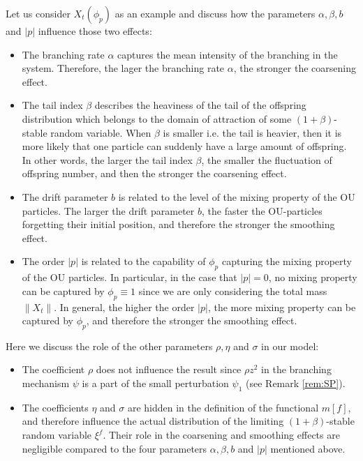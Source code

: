 \documentclass[EJP]{ejpecp} %
\begin{document}
Let us consider $X_t(\phi_p)$ as an example and discuss how the parameters $\alpha, \beta, b$ and $|p|$
influence those two effects:
\begin{itemize}
\item
  The branching rate $\alpha$ captures the mean intensity of the branching in the system.
  Therefore, the lager the branching rate $\alpha$, the stronger the coarsening effect.
\item
  The tail index $\beta$ describes the heaviness of the tail of the offspring distribution which belongs to the domain of attraction of some $(1+\beta)$-stable random variable.
When $\beta$ is smaller i.e. the tail is heavier, then it is more likely that 
one particle can suddenly have a large amount of offspring.
In other words, the larger the tail index $\beta$, the smaller the fluctuation of offspring number, and then the stronger the coarsening effect.
\item
 The drift parameter $b$ is related to the level of the mixing property of the OU particles.
  The larger the drift parameter $b$, the faster the OU-particles forgetting their initial position, and therefore the stronger the smoothing effect.
\item
    The order $|p|$ is related to the capability of $\phi_p$ capturing the mixing property of the OU particles.
  In particular, in the case that $|p| = 0$, no mixing property can be captured by $\phi_p \equiv 1$ since we are only considering the total mass $\|X_t\|$.
  In general, the higher the order $|p|$, the more mixing property can be captured by $\phi_p$, and therefore the stronger the smoothing effect.
\end{itemize}
Here we discuss the role of the other parameters $\rho, \eta$ and $\sigma$ in our model:
\begin{itemize}
\item
  The coefficient $\rho$ does not influence the result since $\rho z^2$ in the branching mechanism $\psi$ is a part of the small perturbation $\psi_1$
  (see Remark \ref{rem:SP}).
\item
  The coefficients $\eta$ and $\sigma$ are hidden in the definition of the functional $m[f]$, and therefore influence the actual distribution of the limiting $(1+\beta)$-stable random variable $\xi^f$.
  Their role in the coarsening and smoothing effects are negligible compared to the four parameters $\alpha, \beta, b$ and $|p|$ mentioned above.
\end{itemize}
\end{document}
